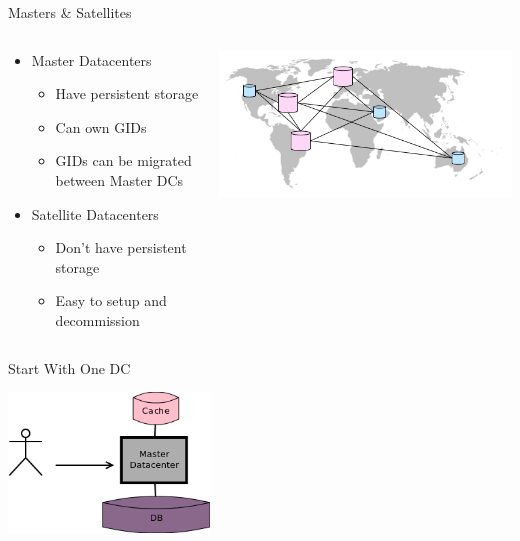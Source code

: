 \documentclass[aspectratio=169]{beamer}
\begin{document}
\begin{frame}{Masters \& Satellites}
    \begin{columns}
        \begin{column}[c]{0.6\textwidth}
            \begin{itemize}
                \item Master Datacenters
                    \begin{itemize}
                        \item Have persistent storage
                        \item Can own GIDs
                        \item GIDs can be migrated between Master DCs
                    \end{itemize}
                \item Satellite Datacenters
                    \begin{itemize}
                        \item Don't have persistent storage
                        \item Easy to setup and decommission
                    \end{itemize}
            \end{itemize}
        \end{column}
        \begin{column}[c]{0.4\textwidth}
            \includegraphics[width=\textwidth]{images/worldmapdc.png}
        \end{column}
    \end{columns}
\end{frame}

\begin{frame}{Start With One DC}
    \begin{center}
        \includegraphics[width=0.4\textwidth]{images/scalingdcs1.png}
    \end{center}
\end{frame}
\end{document}
